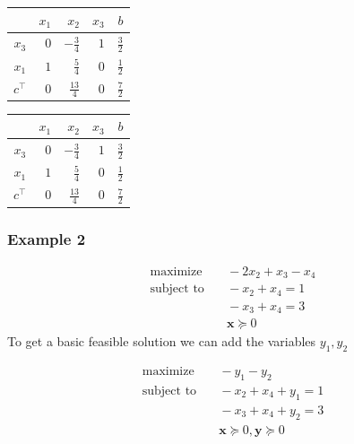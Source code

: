 \documentclass[11pt]{article}
\begin{document}
\begin{center}
\begin{tabular}{c|rrrr}
    & $x_1$ & $x_2$ & $x_3$ & $b$ \\
\hline
$x_3$ & $0$ & $-\frac{3}{4}$ & $1$ & $\frac{3}{2}$ \\
$x_1$ & $1$ & $\frac{5}{4}$ & $0$ & $\frac{1}{2}$ \\
\hline
$c^\top$ & $0$ & $\frac{13}{4}$ & $0$ & $\frac{7}{2}$
\end{tabular}
\end{center}

\begin{center}
\begin{tabular}{c|rrrr}
    & $x_1$ & $x_2$ & $x_3$ & $b$ \\
\hline
$x_3$ & $0$ & $-\frac{3}{4}$ & $1$ & $\frac{3}{2}$ \\
$x_1$ & $1$ & $\frac{5}{4}$ & $0$ & $\frac{1}{2}$ \\
\hline
$c^\top$ & $0$ & $\frac{13}{4}$ & $0$ & $\frac{7}{2}$
\end{tabular}
\end{center}

\subsubsection{Example 2}

\begin{align}
  \text{maximize} & \quad -2 x_2 + x_3 - x_4 \\
  \text{subject to} & \quad - x_2 + x_4 = 1 \\
  & \quad - x_3 + x_4 = 3 \\
  & \quad \textbf{x} \succeq 0
\end{align}
To get a basic feasible solution we can add the variables $y_1, y_2$

\begin{align}
  \text{maximize} & \quad - y_1 - y_2 \\
  \text{subject to} & \quad - x_2 + x_4 + y_1= 1 \\
  & \quad - x_3 + x_4 + y_2 = 3 \\
  & \quad \textbf{x} \succeq 0, \textbf{y} \succeq 0
\end{align}
\end{document}
